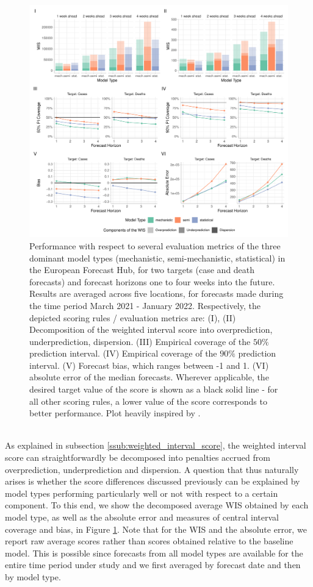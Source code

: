 \begin{figure}
\centering
\includegraphics[width = \textwidth]{../plots/overall_assessment_model_types.pdf}
\caption{Performance with respect to several evaluation metrics of the three dominant model types (mechanistic, semi-mechanistic, statistical) in the European Forecast Hub, for two targets (case and death forecasts) and forecast horizons one to four weeks into the future. Results are averaged across five locations, for forecasts made during the time period March 2021 - January 2022. Respectively, the depicted scoring rules / evaluation metrics are: (I), (II) Decomposition of the weighted interval score into overprediction, underprediction, dispersion. (III) Empirical coverage of the $50\%$ prediction interval. (IV) Empirical coverage of the $90\%$ prediction interval. (V) Forecast bias, which ranges between -1 and 1. (VI) absolute error of the median forecasts. Wherever applicable, the desired target value of the score is shown as a black solid line - for all other scoring rules, a lower value of the score corresponds to better performance. Plot heavily inspired by \cite{bosse_comparing_2021-1}.}
\label{fig:decomp_model_types}
\end{figure}\medskip\\ 
\noindent As explained in subsection \ref{ssub:weighted_interval_score}, the weighted interval score can straightforwardly be decomposed into penalties accrued from overprediction, underprediction and dispersion. A question that thus naturally arises is whether the score differences discussed previously can be explained by model types performing particularly well or not with respect to a certain component. To this end, we show the decomposed average WIS obtained by each model type, as well as the absolute error and measures of central interval coverage and bias, in Figure \ref{fig:decomp_model_types}. Note that for the WIS and the absolute error, we report raw average scores rather than scores obtained relative to the baseline model. This is possible since forecasts from all model types are available for the entire time period under study and we first averaged by forecast date and then by model type.\\ 

